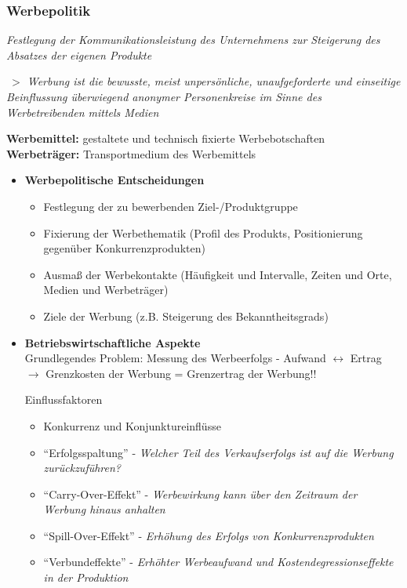 \documentclass[a4paper,11pt, twoside]{article}
\begin{document}
\newpage
\subsubsection*{Werbepolitik}
\textit{Festlegung der Kommunikationsleistung des Unternehmens zur Steigerung des Absatzes der eigenen Produkte}

\textit{$\>>$ Werbung ist die bewusste, meist unpersönliche, unaufgeforderte und einseitige Beinflussung überwiegend anonymer Personenkreise im Sinne des Werbetreibenden mittels Medien} 

\textbf{Werbemittel:} gestaltete und technisch fixierte Werbebotschaften\\
\textbf{Werbeträger:} Transportmedium des Werbemittels\\

\begin{itemize}
\item \textbf{Werbepolitische Entscheidungen}
\begin{itemize}
	\item Festlegung der zu bewerbenden Ziel-/Produktgruppe  
	\item Fixierung der Werbethematik (Profil des Produkts, Positionierung gegenüber Konkurrenzprodukten)
	\item Ausmaß der Werbekontakte (Häufigkeit und Intervalle, Zeiten und Orte, Medien und Werbeträger)
	\item Ziele der Werbung (z.B. Steigerung des Bekanntheitsgrads)
\end{itemize}

\item \textbf{Betriebswirtschaftliche Aspekte}\\
Grundlegendes Problem: Messung des Werbeerfolgs - Aufwand $\leftrightarrow$ Ertrag\\
$\rightarrow$ Grenzkosten der Werbung = Grenzertrag der Werbung!!

Einflussfaktoren
\begin{itemize}
	\item Konkurrenz und Konjunktureinflüsse
	\item "`Erfolgsspaltung"' - \textit{Welcher Teil des Verkaufserfolgs ist auf die Werbung zurückzuführen?}
	\item "`Carry-Over-Effekt"' - \textit{Werbewirkung kann über den Zeitraum der Werbung hinaus anhalten}
	\item "`Spill-Over-Effekt"' - \textit{Erhöhung des Erfolgs von Konkurrenzprodukten}
	\item "`Verbundeffekte"' - \textit{Erhöhter Werbeaufwand und Kostendegressionseffekte in der Produktion}
\end{itemize}


\end{itemize}
\end{document}
